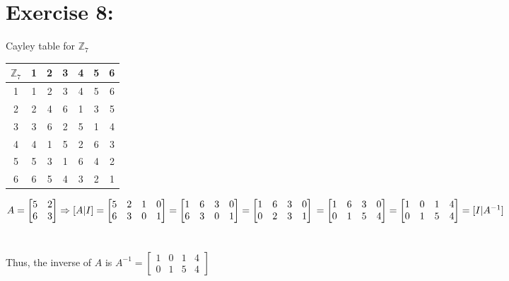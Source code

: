 \documentclass{article}
\newcommand{\Z}{\mathbb{Z}}
\begin{document}
	\section{Exercise 8:}
		Cayley table for $\Z_7$
	
		\centering
		\begin{tabular} {| c |c c c c c c |}
			\hline
			$\Z_7$ & 1 & 2 & 3 & 4 & 5 & 6\\
			\hline
			1 		  & 1 & 2 & 3 & 4 & 5 & 6\\
			2 		  & 2 & 4 & 6 & 1 & 3 & 5\\
			3 		  & 3 & 6 & 2 & 5 & 1 & 4\\
			4 		  & 4 & 1 & 5 & 2 & 6 & 3\\
			5 		  & 5 & 3 & 1 & 6 & 4 & 2\\
			6 		  & 6 & 5 & 4 & 3 & 2 & 1\\
			\hline
		\end{tabular}
		
		\justify
		\begin{math}
			A = \begin{bmatrix}
					5 & 2\\
					6 & 3
				\end{bmatrix}
			\Rightarrow
			[A|I] =	\begin{bmatrix}
				  		5 & 2 & 1 & 0\\
						6 & 3 & 0 & 1
			  		\end{bmatrix}
			  	  = \begin{bmatrix}
			  	  		1 & 6 & 3 & 0\\
			  	  		6 & 3 & 0 & 1
			  	  \end{bmatrix}
			  	  = \begin{bmatrix}
			  	  		1 & 6 & 3 & 0\\
			  	  		0 & 2 & 3 & 1
			  	  \end{bmatrix}
			  	  \\\\\\
			  	  = \begin{bmatrix}
					  	1 & 6 & 3 & 0\\
					  	0 & 1 & 5 & 4
			  	  \end{bmatrix}
			  	  = \begin{bmatrix}
				  	    1 & 0 & 1 & 4\\
						0 & 1 & 5 & 4\\					
			  	  \end{bmatrix}
			  	  = [I|A^{-1}]
		\end{math}\\\\\\
		Thus, the inverse of $A$ is $A^{-1} = \begin{bmatrix}
												1 & 0 & 1 & 4\\
												0 & 1 & 5 & 4	
											  \end{bmatrix}$
\end{document}
